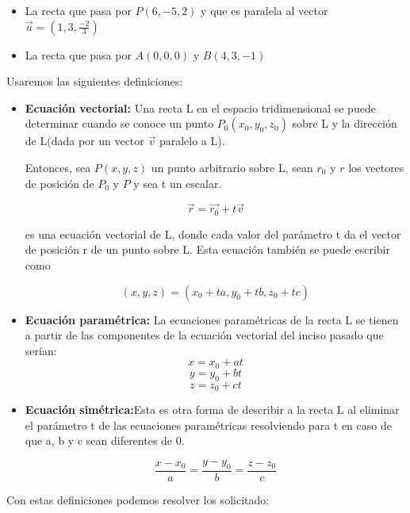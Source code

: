 \documentclass[12pt]{article}
\begin{document}
\begin{itemize}
  
\item La recta que pasa por $P(6,-5,2)$ y que es paralela al vector $\vec{u}=(1,3,\frac{-2}{3})$
  
\item La recta que pasa por $A(0,0,0)$ y $B(4,3,-1)$
  
\end{itemize}

Usaremos las siguientes definiciones:

\begin{itemize}
  
\item \textbf{Ecuación vectorial:} Una recta L en el espacio tridimensional se puede determinar cuando se conoce un punto $P_0(x_0, y_0, z_0)$ sobre L y la dirección de L(dada por un vector $\vec{v}$ paralelo a L).
  
  Entonces, sea $P(x, y, z)$ un punto arbitrario sobre L, sean $r_0$ y $r$ los vectores de posición de $P_0$ y $P$ y sea t un escalar.
  
  $$\vec{r} = \vec{r_0} + t\vec{v}$$
  
  es una ecuación vectorial de L, donde cada valor del parámetro t da el vector de posición r de un punto sobre L.
  Esta ecuación también se puede escribir como
  
  $$ (x, y, z) = (x_0+ta, y_0+tb, z_0+tc)$$
  
\item \textbf{Ecuación paramétrica:} La ecuaciones paramétricas de la recta L se tienen a partir de las componentes de la ecuación vectorial del inciso pasado que serían:
  $$x = x_0 + at$$
  $$y = y_0 + bt$$
  $$z = z_0 + ct$$
  
\item \textbf{Ecuación simétrica:}Esta es otra forma de describir a la recta L al eliminar el parámetro t de las ecuaciones paramétricas resolviendo para t en caso de que a, b y c sean diferentes de 0.
  
  \[
  \frac{x-x_0}{a} = \frac{y-y_0}{b} = \frac{z-z_0}{c}
  \]
  
\end{itemize}

Con estas definiciones podemos resolver los solicitado:
\end{document}
